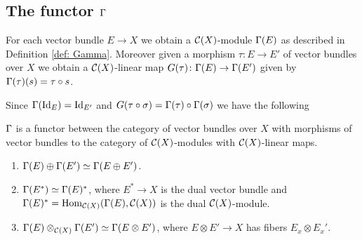 \subsection{The functor $\Gamma$}

For each vector bundle $E\to X$ we obtain a $\mathcal{C}(X)$-module $\Gamma(E)$ as described in Definition \eqref{def: Gamma}. Moreover given a morphism $\tau\colon E\to E'$ of vector bundles over $X$ we obtain a $\mathcal{C}(X)$-linear map $G(\tau)\colon\Gamma(E)\to\Gamma(E')$ given by $\Gamma(\tau)(s)=\tau\circ s$.

\noindent Since $\Gamma(\mathrm{Id}_E)=\mathrm{Id}_{E'}$ and $G(\tau\circ\sigma)=\Gamma(\tau)\circ\Gamma(\sigma)$ we have the following
\begin{lemma}
 $\Gamma$ is a functor between the category of vector bundles over $X$ with morphisms of vector bundles to the category of $\mathcal{C}(X)$-modules with $\mathcal{C}(X)$-linear maps.
\end{lemma}

\begin{proposition}\noindent 
 \begin{enumerate}
  \item $\Gamma(E)\oplus\Gamma(E')\simeq\Gamma(E\oplus E')$.
  \item $\Gamma(E^\ast)\simeq\Gamma(E)^\ast$, where $E^\ast\to X$ is the dual vector bundle and $\Gamma(E)^\ast=\mathrm{Hom}_{\mathcal{C}(X)}(\Gamma(E),\mathcal{C}(X))$ is the dual $\mathcal{C}(X)$-module.
  \item $\Gamma(E)\otimes_{\mathcal{C}(X)}\Gamma(E')\simeq\Gamma(E\otimes E')$, where $E\otimes E'\to X$ has fibers $E_x\otimes E_x'$.
 \end{enumerate}
\end{proposition}

